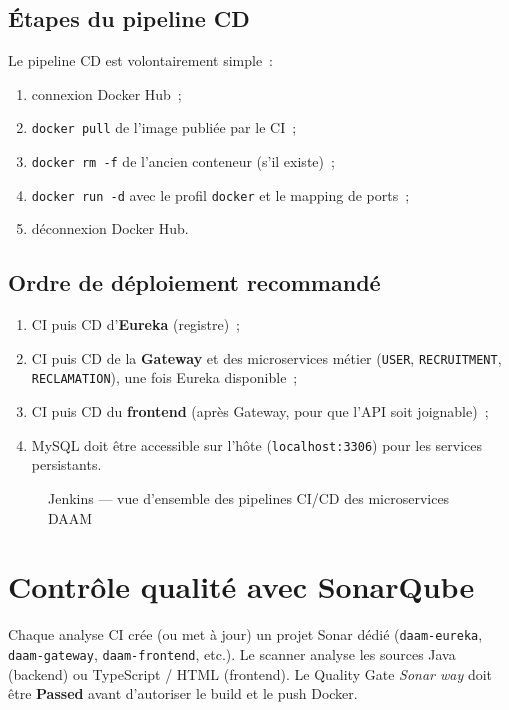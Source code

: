 \subsection{Étapes du pipeline CD}

Le pipeline CD est volontairement simple~:
\begin{enumerate}
  \item connexion Docker Hub~;
  \item \texttt{docker pull} de l'image publiée par le CI~;
  \item \texttt{docker rm -f} de l'ancien conteneur (s'il existe)~;
  \item \texttt{docker run -d} avec le profil \texttt{docker} et le
        mapping de ports~;
  \item déconnexion Docker Hub.
\end{enumerate}

\subsection{Ordre de déploiement recommandé}

\begin{enumerate}
  \item CI puis CD d'\textbf{Eureka} (registre)~;
  \item CI puis CD de la \textbf{Gateway} et des microservices métier
        (\texttt{USER}, \texttt{RECRUITMENT}, \texttt{RECLAMATION}), une
        fois Eureka disponible~;
  \item CI puis CD du \textbf{frontend} (après Gateway, pour que l'API
        soit joignable)~;
  \item MySQL doit être accessible sur l'hôte (\texttt{localhost:3306})
        pour les services persistants.
\end{enumerate}

\begin{figure}[H]
  \centering
  \caption{Jenkins --- vue d'ensemble des pipelines CI/CD des microservices DAAM}
  \label{fig:devops-jenkins-pipelines}
\end{figure}


\section{Contrôle qualité avec SonarQube}

Chaque analyse CI crée (ou met à jour) un projet Sonar dédié
(\texttt{daam-eureka}, \texttt{daam-gateway}, \texttt{daam-frontend},
etc.). Le scanner analyse les sources Java (backend) ou TypeScript /
HTML (frontend). Le Quality Gate \emph{Sonar way} doit être
\textbf{Passed} avant d'autoriser le build et le push Docker.

